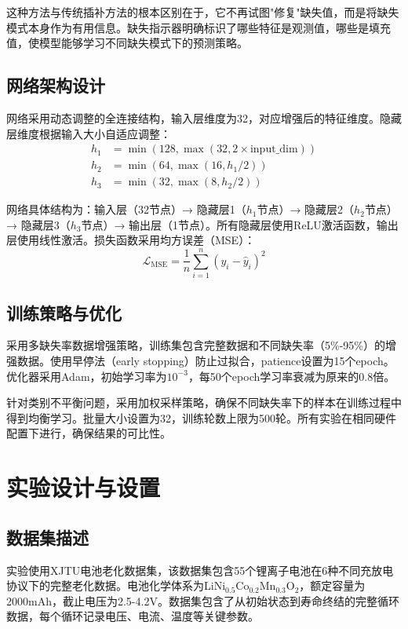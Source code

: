 \documentclass{ctexart}
\begin{document}
这种方法与传统插补方法的根本区别在于，它不再试图"修复"缺失值，而是将缺失模式本身作为有用信息。缺失指示器明确标识了哪些特征是观测值，哪些是填充值，使模型能够学习不同缺失模式下的预测策略。

\subsection{网络架构设计}
网络采用动态调整的全连接结构，输入层维度为32，对应增强后的特征维度。隐藏层维度根据输入大小自适应调整：
\begin{align}
h_1 &= \min(128, \max(32, 2 \times \text{input\_dim})) \\
h_2 &= \min(64, \max(16, h_1 / 2)) \\
h_3 &= \min(32, \max(8, h_2 / 2))
\end{align}

网络具体结构为：输入层（32节点）→ 隐藏层1（$h_1$节点）→ 隐藏层2（$h_2$节点）→ 隐藏层3（$h_3$节点）→ 输出层（1节点）。所有隐藏层使用ReLU激活函数，输出层使用线性激活。损失函数采用均方误差（MSE）：
\begin{equation}
\mathcal{L}_{\text{MSE}} = \frac{1}{n}\sum_{i=1}^{n}(y_i - \hat{y}_i)^2
\end{equation}

\subsection{训练策略与优化}
采用多缺失率数据增强策略，训练集包含完整数据和不同缺失率（5\%-95\%）的增强数据。使用早停法（early stopping）防止过拟合，patience设置为15个epoch。优化器采用Adam，初始学习率为$10^{-3}$，每50个epoch学习率衰减为原来的0.8倍。

针对类别不平衡问题，采用加权采样策略，确保不同缺失率下的样本在训练过程中得到均衡学习。批量大小设置为32，训练轮数上限为500轮。所有实验在相同硬件配置下进行，确保结果的可比性。

\section{实验设计与设置}

\subsection{数据集描述}
实验使用XJTU电池老化数据集，该数据集包含55个锂离子电池在6种不同充放电协议下的完整老化数据。电池化学体系为LiNi$_{0.5}$Co$_{0.2}$Mn$_{0.3}$O$_2$，额定容量为2000mAh，截止电压为2.5-4.2V。数据集包含了从初始状态到寿命终结的完整循环数据，每个循环记录电压、电流、温度等关键参数。
\end{document}
